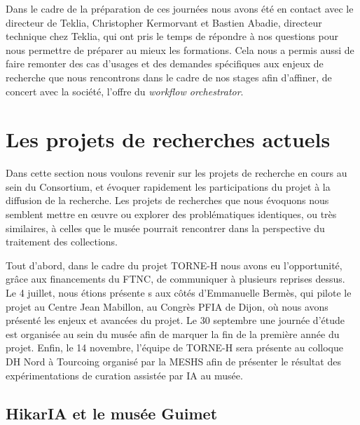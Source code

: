 Dans le cadre de la préparation de ces journées nous avons été en contact avec le directeur de Teklia, Christopher Kermorvant et Bastien Abadie, directeur technique chez Teklia, qui ont pris le temps de répondre à nos questions pour nous permettre de préparer au mieux les formations. Cela nous a permis aussi de faire remonter des cas d'usages et des demandes spécifiques aux enjeux de recherche que nous rencontrons dans le cadre de nos stages afin d'affiner, de concert avec la société, l'offre du \textit{workflow orchestrator}. 

\section{Les projets de recherches actuels}

Dans cette section nous voulons revenir sur les projets de recherche en cours au sein du Consortium, et évoquer rapidement les participations du projet à la diffusion de la recherche. Les projets de recherches que nous évoquons nous semblent mettre en œuvre ou explorer des problématiques identiques, ou très similaires, à celles que le musée pourrait rencontrer dans la perspective du traitement des collections. 

Tout d'abord, dans le cadre du projet TORNE-H nous avons eu l'opportunité, grâce aux financements du FTNC, de communiquer à plusieurs reprises dessus. Le 4 juillet, nous étions présent\wokisme e \wokisme s aux côtés d'Emmanuelle Bermès, qui pilote le projet au Centre Jean Mabillon, au Congrès PFIA de Dijon, où nous avons présenté les enjeux et avancées du projet. Le 30 septembre une journée d'étude est organisée au sein du musée afin de marquer la fin de la première année du projet. Enfin, le 14 novembre, l'équipe de TORNE-H sera présente au colloque DH Nord à Tourcoing organisé par la MESHS afin de présenter le résultat des expérimentations de curation assistée par IA au musée. 

\subsection{HikarIA et le musée Guimet}

